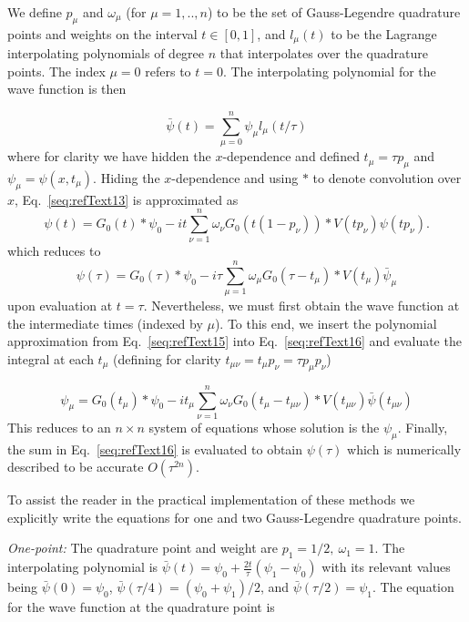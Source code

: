\documentclass[review,letterpaper]{elsarticle}
\begin{document}
We define  $p_{\mu }$ and  $\omega _{\mu }$ (for  $\mu =1,..,n$) to be the set of Gauss-Legendre  quadrature points and
weights on the interval  $t\in[0,1]$, and  $l_{\mu }(t)$ to be the Lagrange interpolating
polynomials of degree  $n$ that interpolates over the quadrature points.
The index  $\mu =0$ refers to  $t=0$.  The interpolating polynomial for the wave function is then

\begin{equation}\label{seq:refText14}
\bar{\psi }(t)=\sum _{\mu =0}^{n}\psi _{\mu }l_{\mu }(t/\tau )
\end{equation}
where for clarity we have hidden the  $x$-dependence and defined  $t_{\mu }=\tau p_{\mu }$
and  $\psi _{\mu }=\psi (x,t_{\mu })$.
Hiding the  $x$-dependence and using  $\text{*}$ to denote convolution over  $x$,
Eq.~\ref{seq:refText13} is approximated as
\begin{equation}\label{seq:refText15}
\psi (t)=G_{0}(t)\ast \psi _{0}-it\sum _{\nu =1}^{n}\omega _{\nu }G_{0}(t(1-p_{\nu }))\ast V(tp_{\nu })\psi (tp_{\nu }).
\end{equation}
which reduces to
\begin{equation}\label{seq:refText16}
\psi (\tau )=G_{0}(\tau )\ast \psi _{0}-i\tau \sum _{\mu =1}^{n}\omega _{\mu }G_{0}(\tau -t_{\mu })\ast V(t_{\mu })\bar{\psi }_{\mu }
\end{equation}
upon evaluation at $t=\tau$. Nevertheless, we must first obtain the wave function at the
intermediate times (indexed by  $\mu$).
To this end, we insert the polynomial approximation from Eq.~\ref{seq:refText15}
into Eq.~\ref{seq:refText16} and evaluate the integral at each  $t_{\mu }$
(defining for clarity  $t_{\mu \nu }=t_{\mu }p_{\nu }=\tau p_{\mu }p_{\nu }$)

\begin{equation}\label{qcform}
\psi _{\mu }=G_{0}(t_{\mu })\ast \psi _{0}-it_{\mu }\sum _{\nu =1}^{n}\omega _{\nu }G_{0}(t_{\mu }-t_{\mu \nu })\ast V(t_{\mu \nu })\bar{\psi }(t_{\mu \nu })
\end{equation}
This reduces to an  $n\times n$ system of equations whose solution is the $\psi _{\mu }$.
Finally, the sum in Eq.~\ref{seq:refText16} is evaluated to obtain  $\psi (\tau )$ which is
numerically described to be accurate $O(\tau ^{2n})$.

To assist the reader in the practical implementation of these methods we explicitly write the
equations for one and two Gauss-Legendre quadrature points.

\textit{One-point:} The quadrature point and weight are  $p_{1}=1/2,\: \omega _{1}=1$.
The interpolating polynomial is  $\bar{\psi }(t)=\psi _{0}+\frac{2t}{\tau }(\psi _{1}-\psi _{0})$
with its relevant values being  $\bar{\psi }(0)=\psi _{0}$,
$\bar{\psi }(\tau /4)=(\psi _{0}+\psi _{1})/2$, and  $\bar{\psi }(\tau /2)=\psi _{1}$.
The equation for the wave function at the quadrature point is
\end{document}

